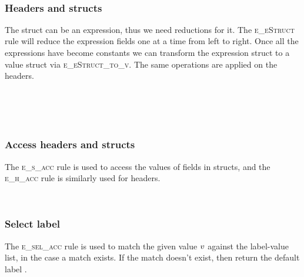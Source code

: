 \documentclass[UTF8]{article}
\begin{document}
\begin{figure}[ht!]
    \ottusedrule{\ottdruleeXXcallXXargs{}} \\
    \ottusedrule{\ottdruleeXXcallXXnewframe{}}
\end{figure}


\subsubsection*{Headers and structs}
The struct can be an expression, thus we need reductions for it. The \textsc{e\_eStruct} rule will reduce the expression fields one at a time from left to right. Once all the expressions have become constants we can transform the expression struct to a value struct via \textsc{e\_eStruct\_to\_v}. The same operations are applied on the headers.

\begin{figure}[ht!]
    \ottusedrule{\ottdruleeXXeStruct{}} \\
    \ottusedrule{\ottdruleeXXeStructXXtoXXv{}} \\
    \ottusedrule{\ottdruleeXXeHeader{}} \\
    \ottusedrule{\ottdruleeXXeHeaderXXtoXXv{}}
\end{figure}


\subsubsection*{Access headers and structs}
The \textsc{e\_s\_acc} rule is used to access the values of fields in structs, and the \textsc{e\_h\_acc} rule is similarly used for headers.

\begin{figure}[ht!]
    \ottusedrule{\ottdruleeXXsXXacc{}} \\
    \ottusedrule{\ottdruleeXXhXXacc{}} 
\end{figure}


\subsubsection*{Select label}
The \textsc{e\_sel\_acc} rule is used to match the given value $v$ against the label-value list, in the case a match exists. If the match doesn't exist, then return the default label \vn.

\begin{figure}[ht!]
    \ottusedrule{\ottdruleeXXselXXacc{}}
\end{figure}
\end{document}
